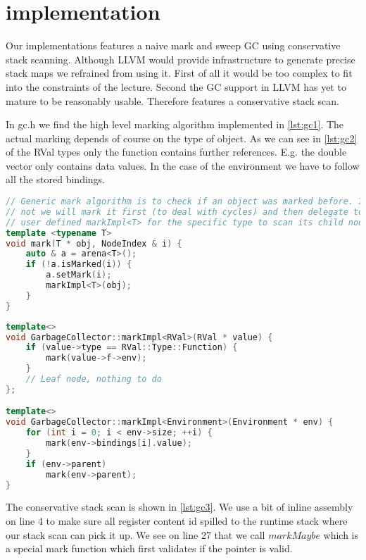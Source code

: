 \section{\Rift implementation}

Our \rift implementations features a naive mark and sweep GC using conservative stack scanning. Although LLVM would provide infrastructure to generate precise stack maps we refrained from using it. First of all it would be too complex to fit into the constraints of the lecture. Second the GC support in LLVM has yet to mature to be reasonably usable. Therefore \rift features a conservative stack scan.

In gc.h we find the high level marking algorithm implemented in \autoref{lst:gc1}. The actual marking depends of course on the type of object. As we can see in \autoref{lst:gc2} of the RVal types only the function contains further references. E.g. the double vector only contains data values. In the case of the environment we have to follow all the stored bindings.

\begin{lstlisting}[language=cpp, caption={Generic marking}, label={lst:gc1}]
// Generic mark algorithm is to check if an object was marked before. Iff
// not we will mark it first (to deal with cycles) and then delegate to the
// user defined markImpl<T> for the specific type to scan its child nodes.
template <typename T>
void mark(T * obj, NodeIndex & i) {
    auto & a = arena<T>();
    if (!a.isMarked(i)) {
        a.setMark(i);
        markImpl<T>(obj);
    }
}
\end{lstlisting}

\begin{lstlisting}[language=cpp, caption={Marking for all object types.}, label={lst:gc2}]
template<>
void GarbageCollector::markImpl<RVal>(RVal * value) {
    if (value->type == RVal::Type::Function) {
        mark(value->f->env);
    }   
    // Leaf node, nothing to do
};

template<>
void GarbageCollector::markImpl<Environment>(Environment * env) {
    for (int i = 0; i < env->size; ++i) {
        mark(env->bindings[i].value);
    }   
    if (env->parent)
        mark(env->parent);
}
\end{lstlisting}

The conservative stack scan is shown in \autoref{lst:gc3}. We use a bit of inline assembly on line 4 to make sure all register content id spilled to the runtime stack where our stack scan can pick it up. We see on line 27 that we call $markMaybe$ which is a special mark function which first validates if the pointer is valid.

